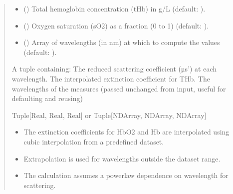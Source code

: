 \documentclass[letterpaper,10pt,english]{sphinxmanual}
\begin{document}
\begin{fulllineitems}
\begin{quote}
\begin{description}
\begin{itemize}
\item {} 
\sphinxAtStartPar
{} () \textendash{} Total hemoglobin concentration (tHb) in g/L (default: ).

\item {} 
\sphinxAtStartPar
{} () \textendash{} Oxygen saturation (sO2) as a fraction (0 to 1) (default: ).

\item {} 
\sphinxAtStartPar
{} (\sphinxstyleliteralemphasis{\sphinxupquote{{[}}}\sphinxstyleliteralemphasis{\sphinxupquote{{]}}}) \textendash{} Array of wavelengths (in nm) at which to compute the values (default: ).

\end{itemize}

\sphinxAtStartPar
A tuple containing:
\sphinxhyphen{} The reduced scattering coefficient (μs’) at each wavelength.
\sphinxhyphen{} The interpolated extinction coefficient for THb.
\sphinxhyphen{} The wavelengths of the measures (passed unchanged from input, useful for defaulting and reusing)

\sphinxAtStartPar
Tuple{[}Real, Real, Real{]} or Tuple{[}NDArray, NDArray, NDArray{]}

\begin{itemize}
\item {} 
\sphinxAtStartPar
The extinction coefficients for HbO2 and Hb are interpolated using cubic
interpolation from a predefined dataset.

\item {} 
\sphinxAtStartPar
Extrapolation is used for wavelengths outside the dataset range.

\item {} 
\sphinxAtStartPar
The calculation assumes a power\sphinxhyphen{}law dependence on wavelength for scattering.

\end{itemize}

\end{description}\end{quote}

\end{fulllineitems}
\end{document}
